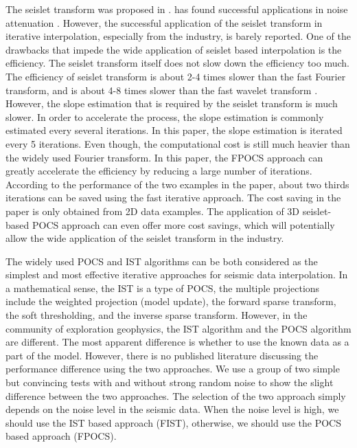 The seislet transform was proposed in \cite{seislet}.   has found successful applications in noise attenuation \cite[]{liuyang20091,seislet}. However, the successful application of the seislet transform in iterative interpolation, especially from the industry, is barely reported. One of the drawbacks that impede the wide application of seislet based interpolation is the efficiency. The seislet transform itself does not slow down the efficiency too much. The efficiency of seislet transform is about 2-4 times slower than the fast Fourier transform, and is about 4-8 times slower than the fast wavelet transform \cite{seislet}.  However, the slope estimation that is required by the seislet transform is much slower. In order to accelerate the process, the slope estimation is commonly estimated every several iterations. In this paper, the slope estimation is iterated every 5 iterations. Even though, the computational cost is still much heavier than the widely used Fourier transform. In this paper, the FPOCS approach can greatly accelerate the efficiency by reducing a large number of iterations. According to the performance of the two examples in the paper, about two thirds iterations can be saved using the fast iterative approach. The cost saving in the paper is only obtained from 2D data examples. The application of 3D seislet-based POCS approach can even offer more cost savings,  which will potentially allow the wide application of the seislet transform in the industry. 


The widely used POCS and IST algorithms can be both considered as the simplest and most effective iterative approaches for seismic data interpolation. In a mathematical sense, the IST is a type of POCS, the multiple projections include the weighted projection (model update), the forward sparse transform, the soft thresholding, and the inverse sparse transform. However, in the community of exploration geophysics, the IST algorithm and the POCS algorithm are different. The most apparent difference is whether to use the known data as a part of the model.  However, there is no published literature discussing the performance difference using the two approaches. We use a group of two simple but convincing tests with and without strong random noise to show the slight difference between the two approaches. The selection of the two approach simply depends on the noise level in the seismic data. When the noise level is high, we should use the IST based approach (FIST), otherwise, we should use the POCS based approach (FPOCS). 



